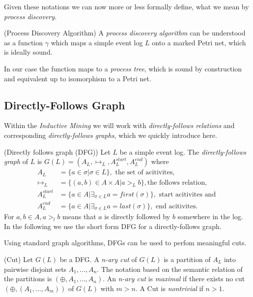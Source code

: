 \documentclass[a4paper]{IEEEtran}
\begin{document}
Given these notations we can now more or less formally define, what we mean by \textit{process discovery.}
\begin{defn} (Process Discovery Algorithm) \cite{process_mining}
A \textit{process discovery algorithm} can be understood as a function $\gamma$ which maps a simple event log $L$ onto a marked Petri net, which is ideally sound. 
\end{defn}
In our case the function maps to a \textit{process tree}, which is sound by construction and equivalent up to isomorphism to a Petri net.


\subsection{Directly-Follows Graph}
Within the \textit{Inductive Mining} we will work with \textit{directly-follows relations} and corresponding \textit{directly-follows graphs}, which we quickly introduce here. 
\begin{defn}(Directly follows graph (DFG)) \cite{process_mining} Let $L$ be a simple event log. The \textit{directly-follows graph } of $L$ is $G(L) = ( A_L, \mapsto_L, A_L^{start}, A_L^{end})$ where 
\begin{align}
    A_L &= \{ a \in \sigma | \sigma \in L\}, \text{ the set of acitivites}, \\
    \mapsto_L &= \{ (a,b) \in A \times A | a >_L b \}, \text{the follows relation}, \\
    A_L^{start} &= \{ a \in A | \exists_{\sigma \in L} a = first(\sigma) \}, \text{ start acitivites} \text{ and } \\
    A_L^{end} &= \{ a \in A | \exists_{\sigma \in L} a = last(\sigma) \}, \text{ end acitivites}.
\end{align}
For $a, b \in A, a >_l b$ means that $a$ is directly followed by $b$ somewhere in the log. In the following we use the short form DFG for a directly-follows graph.
\end{defn}
Using standard graph algorithms, DFGs can be used to perfom meaningful cuts.
\begin{defn} (Cut) \cite{process_mining} Let $G(L)$ be a DFG. A \textit{n-ary cut} of $G(L)$ is a partition of $A_L$ into pairwise disjoint sets $A_1, \dots, A_n$. The notation based on the semantic relation of the partitions is $(\oplus, A_1, \dots, A_n)$. An \textit{n-ary cut} is \textit{maximal} if there exists no cut $(\oplus, (A_1, \dots, A_{m}))$ of $G(L)$ with $m > n$. A Cut is \textit{nontrivial} if $n > 1$. 
\end{defn}
\end{document}
